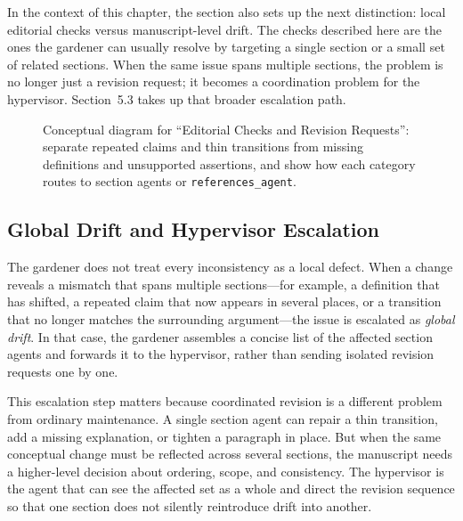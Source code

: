 \documentclass[11pt]{article}
\begin{document}
In the context of this chapter, the section also sets up the next distinction: local editorial checks versus manuscript-level drift. The checks described here are the ones the gardener can usually resolve by targeting a single section or a small set of related sections. When the same issue spans multiple sections, the problem is no longer just a revision request; it becomes a coordination problem for the hypervisor. Section~5.3 takes up that broader escalation path.

\begin{figure}[htbp]
\centering

\caption{Conceptual diagram for ``Editorial Checks and Revision Requests'': separate repeated claims and thin transitions from missing definitions and unsupported assertions, and show how each category routes to section agents or \texttt{references\_agent}.}
\end{figure}



\subsection{Global Drift and Hypervisor Escalation}


The gardener does not treat every inconsistency as a local defect. When a change reveals a mismatch that spans multiple sections---for example, a definition that has shifted, a repeated claim that now appears in several places, or a transition that no longer matches the surrounding argument---the issue is escalated as \emph{global drift}. In that case, the gardener assembles a concise list of the affected section agents and forwards it to the hypervisor, rather than sending isolated revision requests one by one.

This escalation step matters because coordinated revision is a different problem from ordinary maintenance. A single section agent can repair a thin transition, add a missing explanation, or tighten a paragraph in place. But when the same conceptual change must be reflected across several sections, the manuscript needs a higher-level decision about ordering, scope, and consistency. The hypervisor is the agent that can see the affected set as a whole and direct the revision sequence so that one section does not silently reintroduce drift into another.
\end{document}
